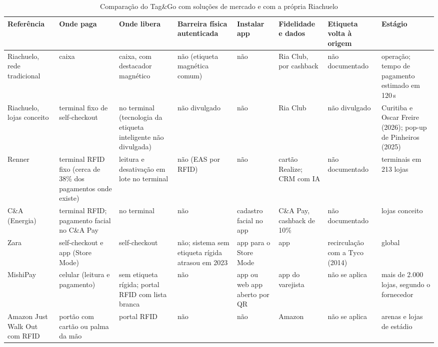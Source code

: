 \begin{landscape}
\begin{table}[htbp]
    \centering
    \caption{Comparação do Tag\&Go com soluções de mercado e com a própria Riachuelo}
    \label{tab:r2-diferenciacao}
    \scriptsize
    \setlength{\tabcolsep}{3pt}
    \renewcommand{\arraystretch}{1.25}
    \begin{tabularx}{\linewidth}{@{}
        >{\RaggedRight\arraybackslash}p{2.5cm}
        >{\RaggedRight\arraybackslash}X
        >{\RaggedRight\arraybackslash}X
        >{\RaggedRight\arraybackslash}X
        >{\RaggedRight\arraybackslash}p{2.4cm}
        >{\RaggedRight\arraybackslash}X
        >{\RaggedRight\arraybackslash}p{2.6cm}
        >{\RaggedRight\arraybackslash}X@{}}
        \toprule
        \textbf{Referência} & \textbf{Onde paga} & \textbf{Onde libera} & \textbf{Barreira física autenticada} & \textbf{Instalar app} & \textbf{Fidelidade e dados} & \textbf{Etiqueta volta à origem} & \textbf{Estágio} \\
        \midrule
        Riachuelo, rede tradicional & caixa & caixa, com destacador magnético & não (etiqueta magnética comum) & não & Ria Club, por cashback & não documentado & operação; tempo de pagamento estimado em 120\,s \\
        Riachuelo, lojas conceito & terminal fixo de self-checkout & no terminal (tecnologia da etiqueta inteligente não divulgada) & não divulgado & não & Ria Club & não divulgado & Curitiba e Oscar Freire (2026); pop-up de Pinheiros (2025) \\
        Renner & terminal RFID fixo (cerca de 38\% dos pagamentos onde existe) & leitura e desativação em lote no terminal & não (EAS por RFID) & não & cartão Realize; CRM com IA & não documentado & 742 terminais em 213 lojas \\
        C\&A (Energia) & terminal RFID; pagamento facial no C\&A Pay & no terminal & não & cadastro facial no app & C\&A Pay, cashback de 10\% & não documentado & lojas conceito \\
        Zara & self-checkout e app (Store Mode) & self-checkout & não; sistema sem etiqueta rígida atrasou em 2023 & app para o Store Mode & app & recirculação com a Tyco (2014) & global \\
        MishiPay & celular (leitura e pagamento) & sem etiqueta rígida; portal RFID com lista branca & não & app ou web app aberto por QR & app do varejista & não se aplica & mais de 2.000 lojas, segundo o fornecedor \\
        Amazon Just Walk Out com RFID & portão com cartão ou palma da mão & portal RFID & não & não & Amazon & não se aplica & arenas e lojas de estádio \\

\end{tabularx}
\end{table}
\end{landscape}
